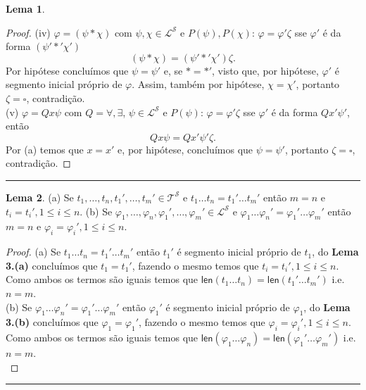 \documentclass[11pt]{article}
\theoremstyle{definition}
\newtheorem{lemma}{Lema}
\newcommand{\mc}[1]{\mathcal{#1}}
\newcommand{\msf}[1]{\mathsf{#1}}
\begin{document}
\begin{lemma}
\begin{proof}
(iv) $\varphi=(\psi*\chi)$ com $\psi,\chi\in\mc{L}^\mc{S}$ e $P(\psi),P(\chi)$: $\varphi=\varphi'\zeta$ sse $\varphi'$ é da forma $(\psi'*'\chi')$
\[
(\psi*\chi)=(\psi'*'\chi')\zeta.
\]
Por hipótese concluímos que $\psi=\psi'$ e, se $*=*'$, visto que, por hipótese, $\varphi'$ é segmento inicial próprio de $\varphi$. Assim, também por hipótese, $\chi=\chi'$, portanto $\zeta=\square$, contradição.\\
(v) $\varphi=Qx\psi$ com $Q=\forall,\exists$, $\psi\in\mc{L}^\mc{S}$ e $P(\psi)$: $\varphi=\varphi'\zeta$ sse $\varphi'$ é da forma $Qx'\psi'$, então
\[
Qx\psi=Qx'\psi'\zeta.
\]
Por (a) temos que $x=x'$ e, por hipótese, concluímos que $\psi=\psi'$, portanto $\zeta=\square$, contradição.
\end{proof}
\end{lemma}

\hrule

\begin{lemma}
(a) Se $t_1,\dots,t_n,t_1',\dots,t_m'\in\mc{T}^\mc{S}$ e $t_1\dots t_n=t_1'\dots t_m'$ então $m=n$ e $t_i=t_i',1\le i\le n$.
(b) Se $\varphi_1,\dots,\varphi_n,\varphi_1',\dots,\varphi_m'\in\mc{L}^\mc{S}$ e $\varphi_1\dots\varphi_n'=\varphi_1'\dots\varphi_m'$ então $m=n$ e $\varphi_i=\varphi_i',1\le i\le n$.

\begin{proof}
(a) Se $t_1\dots t_n=t_1'\dots t_m'$ então $t_1'$ é segmento inicial próprio de $t_1$, do \textbf{Lema 3.(a)} concluímos que $t_1=t_1'$, fazendo o mesmo temos que $t_i=t_i',1\le i\le n$. Como ambos os termos são iguais temos que $\msf{len}(t_1\dots t_n)=\msf{len}(t_1'\dots t_m')$ i.e. $n=m$.\\
(b) Se $\varphi_1\dots\varphi_n'=\varphi_1'\dots\varphi_m'$ então $\varphi_1'$ é segmento inicial próprio de $\varphi_1$, do \textbf{Lema 3.(b)} concluímos que $\varphi_1=\varphi_1'$, fazendo o mesmo temos que $\varphi_i=\varphi_i',1\le i\le n$. Como ambos os termos são iguais temos que $\msf{len}(\varphi_1\dots \varphi_n)=\msf{len}(\varphi_1'\dots \varphi_m')$ i.e. $n=m$.\\
\end{proof}
\end{lemma}

\hrule
\end{document}
